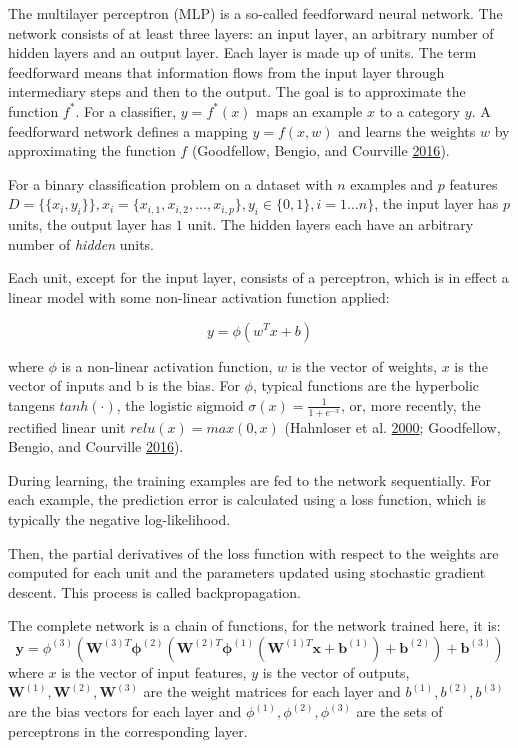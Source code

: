 \documentclass[
  11pt,
  a4paper,
  DIV=12,captions=tableheading,oneside,titlepage]{scrbook}
\begin{document}
The multilayer perceptron (MLP) is a so-called feedforward neural network. The network consists of at least three layers: an input layer, an arbitrary number of hidden layers and an output layer. Each layer is made up of units. The term feedforward means that information flows from the input layer through intermediary steps and then to the output. The goal is to approximate the function \(f^*\). For a classifier, \(y = f^*(x)\) maps an example \(x\) to a category \(y\). A feedforward network defines a mapping \(y=f(x, w)\) and learns the weights \(w\) by approximating the function \(f\) (Goodfellow, Bengio, and Courville \protect\hyperlink{ref-goodfellow2016deep}{2016}).

For a binary classification problem on a dataset with \(n\) examples and \(p\) features \(D = \{\{x_i, y_i\}\}, x_i = \{x_{i,1},x_{i,2},\ldots,x_{i,p}\}, y_i \in \{0,1\}, i = 1 \ldots n\}\), the input layer has \(p\) units, the output layer has \(1\) unit. The hidden layers each have an arbitrary number of \emph{hidden} units.

Each unit, except for the input layer, consists of a perceptron, which is in effect a linear model with some non-linear activation function applied:

\begin{equation}
y = \phi(w^Tx+b)
\label{eq:perceptron}
\end{equation}

where \(\phi\) is a non-linear activation function, \(w\) is the vector of weights, \(x\) is the vector of inputs and b is the bias. For \(\phi\), typical functions are the hyperbolic tangens \(tanh(\cdot)\), the logistic sigmoid \(\sigma(x) = \frac{1}{1+e^{-x}}\), or, more recently, the rectified linear unit \(relu(x) = max(0,x)\) (Hahnloser et al. \protect\hyperlink{ref-hahnloser2000digital}{2000}; Goodfellow, Bengio, and Courville \protect\hyperlink{ref-goodfellow2016deep}{2016}).

During learning, the training examples are fed to the network sequentially. For each example, the prediction error is calculated using a loss function, which is typically the negative log-likelihood.

Then, the partial derivatives of the loss function with respect to the weights are computed for each unit and the parameters updated using stochastic gradient descent. This process is called backpropagation.

The complete network is a chain of functions, for the network trained here, it is: \begin{equation}
\mathbf{y} = \phi^{(3)}(\mathbf{W}^{(3)T} \mathbf{\phi}^{(2)}(\mathbf{W}^{(2)T} \mathbf{\phi}^{(1)}(\mathbf{W}^{(1)T} \mathbf{x} + \mathbf{b}^{(1)}) + \mathbf{b}^{(2)}) + \mathbf{b}^{(3)})
\end{equation} where \(x\) is the vector of input features, \(y\) is the vector of outputs, \(\mathbf{W}^{(1)}, \mathbf{W}^{(2)}, \mathbf{W}^{(3)}\) are the weight matrices for each layer and \(b^{(1)}, b^{(2)}, b^{(3)}\) are the bias vectors for each layer and \(\phi^{(1)}, \phi^{(2)}, \phi^{(3)}\) are the sets of perceptrons in the corresponding layer.
\end{document}
